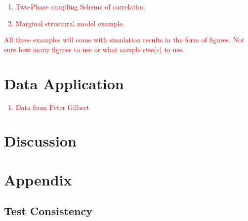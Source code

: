 \documentclass{article}
\newcommand{\sh}{\textcolor{red}}
\begin{document}

\sh{
\begin{enumerate}
	\item Two-Phase sampling Scheme of correlation
	\item Marginal structural model example.
\end{enumerate}
All three examples will come with simulation results in the form of figures.  Not sure how many figures to use or what sample size(s) to use.
}

\section{Data Application}

\sh{\begin{enumerate}
	\item Data from Peter Gilbert
\end{enumerate}
}

\section{Discussion}

\section{Appendix}

\subsection{Test Consistency}
\label{sec:test_cnsty}
\end{document}

